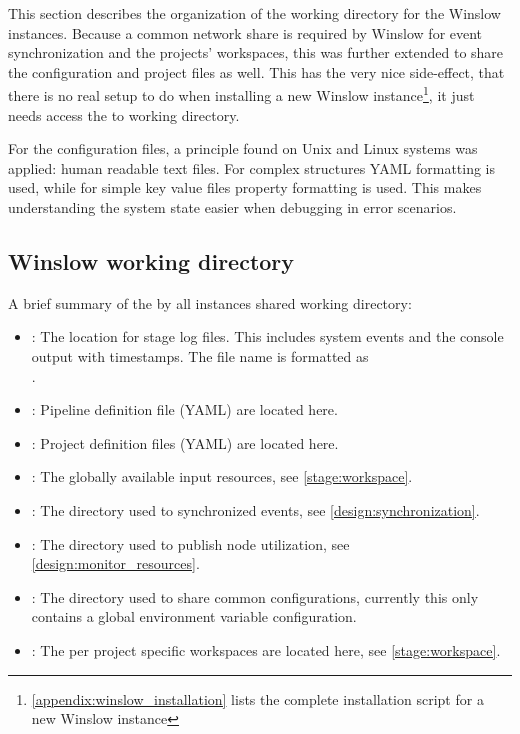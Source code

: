 This section describes the organization of the working directory for the Winslow instances.
Because a common network share is required by Winslow for event synchronization and the projects' workspaces, this was further extended to share the configuration and project files as well.
This has the very nice side-effect, that there is no real setup to do when installing a new Winslow instance\footnote{\autoref{appendix:winslow_installation} lists the complete installation script for a new Winslow instance}, it just needs access the to working directory.

For the configuration files, a principle found on Unix and Linux systems was applied: human readable text files.
For complex structures YAML formatting is used, while for simple key value files property formatting is used.
This makes understanding the system state easier when debugging in error scenarios.

\subsection{Winslow working directory}
\label{design:winslow:workdir}

A brief summary of the by all instances shared working directory:

\begin{itemize}
	\item {}: The location for stage log files.
	This includes system events and the console output with timestamps.
	The file name is formatted as \\
	.
	\item {}: Pipeline definition file (YAML) are located here.
	\item {}: Project definition files (YAML) are located here.
	\item {}: The globally available input resources, see \autoref{stage:workspace}.
	\item {}: The directory used to synchronized events, see \autoref{design:synchronization}.
	\item {}: The directory used to publish node utilization, see \autoref{design:monitor_resources}.
	\item {}: The directory used to share common configurations, currently this only contains a global environment variable configuration.
	\item {}: The per project specific workspaces are located here, see \autoref{stage:workspace}.
\end{itemize}

